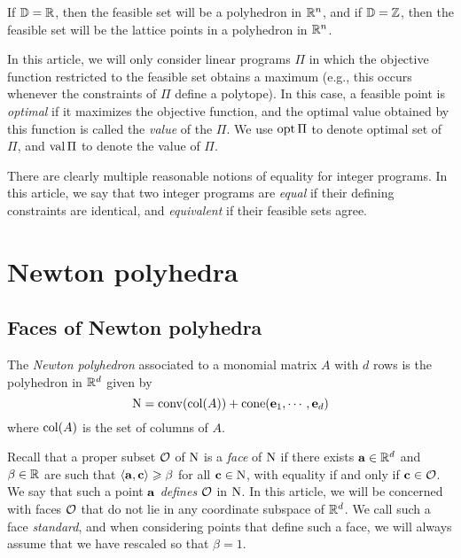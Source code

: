 \documentclass[11pt]{amsart}
\renewcommand{\!}[1]{{\color{red}\text{$\star$\,}#1\,$\star$}}
\begin{document}
If $\mathbb{D} = \mathbb{R}$, then the feasible set  will be a polyhedron in $\mathbb{R}^n$, and if $\mathbb{D} = \mathbb{Z}$, then the feasible set will be the lattice points in a polyhedron in $\mathbb{R}^n$.  

In this article, we will only consider linear programs $\Pi$ in which the objective function restricted to the feasible set obtains a maximum (e.g., this occurs whenever the constraints of $\Pi$ define a polytope).  In this case, a feasible point is \emph{optimal} if it maximizes the objective function, and the optimal value obtained by this function is called the \emph{value} of the $\Pi$.  We use $\operatorname{opt} \Pi$ to denote optimal set of $\Pi$, and $\operatorname{val} \Pi$ to denote the value of $\Pi$. 

There are clearly multiple reasonable notions of equality for integer programs.  In this article,  we say that two integer programs are \emph{equal} if their defining constraints are identical, and \emph{equivalent} if their feasible sets agree. 




\newpage

\section{Newton polyhedra}
\label{newton-polyhedra: S}


\subsection{Faces of Newton polyhedra} The \emph{Newton polyhedron} associated to a monomial matrix $A$ with $d$ rows is the polyhedron in $\mathbb{R}^d$ given by 
\[ \mathrm{N} = \operatorname{conv}( \operatorname{col}(A) ) + \operatorname{cone}( \mathbf{e}_1, \cdots, \mathbf{e}_d) \] where $\operatorname{col}(A)$ is the set of columns of $A$.  

Recall that a proper  subset $\mathcal{O}$ of $\mathrm{N}$ is a \emph{face} of $\mathrm{N}$  if there exists $\mathbf{a} \in \mathbb{R}^d$ and $\beta \in \mathbb{R}$ are such that $\langle \mathbf{a}, \mathbf{c} \rangle \geqslant \beta$ for all $\mathbf{c} \in \mathrm{N}$, with equality if and only if $\mathbf{c} \in \mathcal{O}$.  We say that  such a point $\mathbf{a}$ \emph{defines} $\mathcal{O}$ in $\mathrm{N}$.    In this article, we will be concerned with faces $\mathcal{O}$ that do not lie in any coordinate subspace of $\mathbb{R}^d$.  We call such a face \emph{standard}, and when considering points that define such a face, we will always assume that we have rescaled so that $\beta = 1$. 
\end{document}
